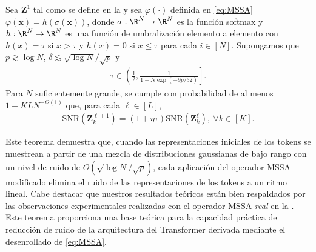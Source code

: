 \documentclass[../../book-main.tex]{subfiles}
\begin{document}
\begin{theorem}\label{thm:1}
    Sea $\bm Z^{1}$ tal como se define en la  y sea $\varphi(\cdot)$
    definida en \eqref{eq:MSSA}
    $\varphi(\bm x) = h\left(\sigma(\bm x)\right)$,
    donde $\sigma:\R^N \to \R^N$ es la función softmax y $h:\R^N
    \to \R^N$ es una función de umbralización elemento a elemento con $h(x) =
    \tau$ si \(x > \tau\) y \(h(x) = 0\) si \(x \leq \tau\) para
    cada $i \in [N]$.
    Supongamos que $p \gtrsim \log N$, $\delta \lesssim \sqrt{\log
    N}/\sqrt{p}$ y
    \begin{align*}
        \tau \in \left( \frac{1}{2},  \frac{1}{1+N\exp(-9p/32)} \right].
    \end{align*}
    Para $N$ suficientemente grande, se cumple con probabilidad de al menos
    $1-KLN^{-\Omega(1)}$ que, para cada $\ell \in [L]$,
    \begin{align}\label{eq:SNR}
        \mathrm{SNR}(\bm Z_k^{\ell+1}) = (1+\eta\tau)
        \mathrm{SNR}(\bm Z_k^{\ell}),\ \forall k \in [K].
    \end{align}
\end{theorem}
Este teorema demuestra que, cuando las representaciones iniciales de los tokens
se muestrean a partir de una mezcla de distribuciones gaussianas de bajo rango con un
nivel de ruido de $O(\sqrt{\log N}/\sqrt{p})$, cada
aplicación del operador MSSA modificado elimina el ruido de las representaciones de los tokens
a un ritmo lineal. Cabe destacar que nuestros resultados teóricos están bien respaldados por
las observaciones experimentales realizadas con el operador MSSA \textit{real} en la
. Este teorema proporciona una base teórica para
la capacidad práctica de reducción de ruido de la arquitectura del Transformer
derivada mediante el desenrollado de \eqref{eq:MSSA}.
\end{document}
